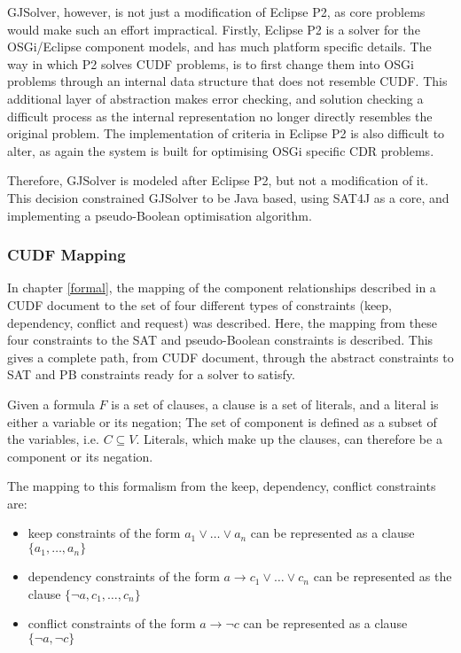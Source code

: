 GJSolver, however, is not just a modification of Eclipse P2, as core problems would make such an effort impractical.
Firstly, Eclipse P2 is a solver for the OSGi/Eclipse component models, and has much platform specific details.
The way in which P2 solves CUDF problems, is to first change them into OSGi problems through an internal data structure that does not resemble CUDF.
This additional layer of abstraction makes error checking, and solution checking a difficult process as the internal representation no longer directly resembles the original problem.
The implementation of criteria in Eclipse P2 is also difficult to alter, as again the system is built for optimising OSGi specific CDR problems.

Therefore, GJSolver is modeled after Eclipse P2, but not a modification of it.
This decision constrained GJSolver to be Java based, 
using SAT4J as a core, and implementing a pseudo-Boolean optimisation algorithm.

\subsubsection{CUDF Mapping}
In chapter \ref{formal},
the mapping of the component relationships described in a CUDF document to the set of four different types of constraints (keep, dependency, conflict and request) was described.
Here, the mapping from these four constraints to the SAT and pseudo-Boolean constraints is described.
This gives a complete path, from CUDF document, through the abstract constraints to SAT and PB constraints ready for a solver to satisfy.

Given a formula $F$ is a set of clauses, a clause is a set of literals, and a literal is either a variable or its negation;
The set of component is defined as a subset of the variables, i.e. $C \subseteq V$.
Literals, which make up the clauses, can therefore be a component or its negation.

The mapping to this formalism from the keep, dependency, conflict constraints are: 
\begin{itemize}
  \item keep constraints of the form $a_1\vee \ldots \vee a_n$  can be represented as a clause $\{a_1,\ldots,a_n\}$
  \item dependency constraints of the form $a \rightarrow c_1 \vee \ldots \vee c_n$ can be represented as the clause $\{\neg a, c_1, \ldots, c_n\}$
  \item conflict constraints of the form $a \rightarrow \neg c$ can be represented as a clause $\{\neg a, \neg c\}$
\end{itemize}

